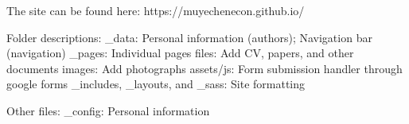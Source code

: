 The site can be found here: https://muyechenecon.github.io/

Folder descriptions:
_data: Personal information (authors); Navigation bar (navigation)
_pages: Individual pages
files: Add CV, papers, and other documents
images: Add photographs
assets/js: Form submission handler through google forms
_includes, _layouts, and _sass: Site formatting

Other files:
_config: Personal information
